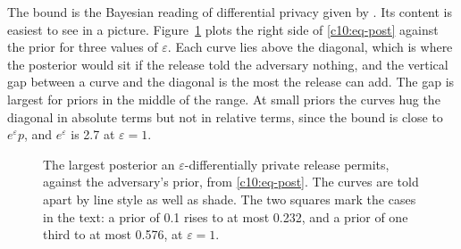 The bound is the Bayesian reading of differential privacy given by
\citet{kasiviswanathan2014}. Its content is easiest to see in a picture.
Figure~\ref{c10:fig-post} plots the right side of \eqref{c10:eq-post} against the
prior for three values of $\varepsilon$. Each curve lies above the diagonal, which
is where the posterior would sit if the release told the adversary nothing, and
the vertical gap between a curve and the diagonal is the most the release can
add. The gap is largest for priors in the middle of the range. At small priors the
curves hug the diagonal in absolute terms but not in relative terms, since the
bound is close to $e^\varepsilon p$, and $e^\varepsilon$ is 2.7 at
$\varepsilon = 1$.

\begin{figure}[ht]
\centering
{}
\caption{The largest posterior an $\varepsilon$-differentially private release
permits, against the adversary's prior, from \eqref{c10:eq-post}. The curves are
told apart by line style as well as shade. The two squares mark the cases in the
text: a prior of 0.1 rises to at most 0.232, and a prior of one third to at most
0.576, at $\varepsilon = 1$.}
\label{c10:fig-post}
\end{figure}

